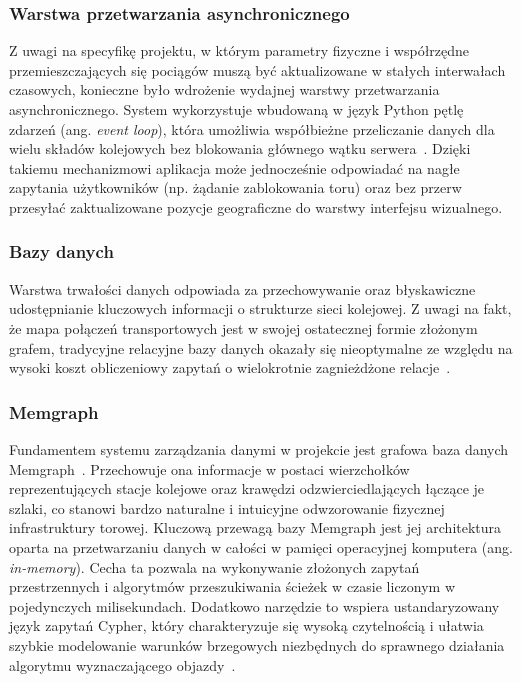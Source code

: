 \documentclass[twoside]{projektInzynierskiMS1z}
\begin{document}
\subsubsection{Warstwa przetwarzania asynchronicznego}

Z uwagi na specyfikę projektu, w którym parametry fizyczne i współrzędne
przemieszczających się pociągów muszą być aktualizowane w stałych interwałach
czasowych, konieczne było wdrożenie wydajnej warstwy przetwarzania asynchronicznego.
System wykorzystuje wbudowaną w język Python pętlę zdarzeń (ang. \emph{event loop}),
która umożliwia współbieżne przeliczanie danych dla wielu składów kolejowych bez
blokowania głównego wątku serwera~\cite{pythonasyncio}. Dzięki takiemu mechanizmowi
aplikacja może jednocześnie odpowiadać na nagłe zapytania użytkowników (np. żądanie
zablokowania toru) oraz bez przerw przesyłać zaktualizowane pozycje geograficzne do
warstwy interfejsu wizualnego.

\subsubsection{Bazy danych}

Warstwa trwałości danych odpowiada za przechowywanie oraz błyskawiczne udostępnianie
kluczowych informacji o strukturze sieci kolejowej. Z uwagi na fakt, że mapa połączeń
transportowych jest w swojej ostatecznej formie złożonym grafem, tradycyjne relacyjne
bazy danych okazały się nieoptymalne ze względu na wysoki koszt obliczeniowy zapytań
o wielokrotnie zagnieżdżone relacje~\cite{graphdatabases}.

\subsubsection{Memgraph}

Fundamentem systemu zarządzania danymi w projekcie jest grafowa baza danych
Memgraph~\cite{memgraph}. Przechowuje ona informacje w postaci wierzchołków
reprezentujących stacje kolejowe oraz krawędzi odzwierciedlających łączące je szlaki,
co stanowi bardzo naturalne i intuicyjne odwzorowanie fizycznej infrastruktury torowej.
Kluczową przewagą bazy Memgraph jest jej architektura oparta na przetwarzaniu danych
w całości w pamięci operacyjnej komputera (ang. \emph{in-memory}). Cecha ta pozwala na
wykonywanie złożonych zapytań przestrzennych i algorytmów przeszukiwania ścieżek
w czasie liczonym w pojedynczych milisekundach. Dodatkowo narzędzie to wspiera
ustandaryzowany język zapytań Cypher, który charakteryzuje się wysoką czytelnością
i ułatwia szybkie modelowanie warunków brzegowych niezbędnych do sprawnego działania
algorytmu wyznaczającego objazdy~\cite{cypher}.
\end{document}
